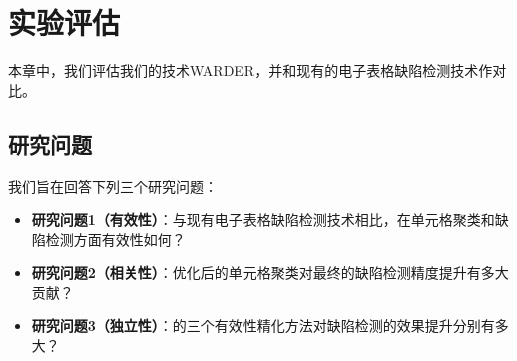 \chapter{实验评估}

本章中，我们评估我们的技术WARDER，并和现有的电子表格缺陷检测技术作对比。

\section{研究问题}

我们旨在回答下列三个研究问题：

\begin{itemize}
    \item \textbf{研究问题1（有效性）}：与现有电子表格缺陷检测技术相比，\wa 在单元格聚类和缺陷检测方面有效性如何？
    \item \textbf{研究问题2（相关性）}：\wa 优化后的单元格聚类对最终的缺陷检测精度提升有多大贡献？
    \item \textbf{研究问题3（独立性）}：\wa 的三个有效性精化方法对缺陷检测的效果提升分别有多大？
\end{itemize}





